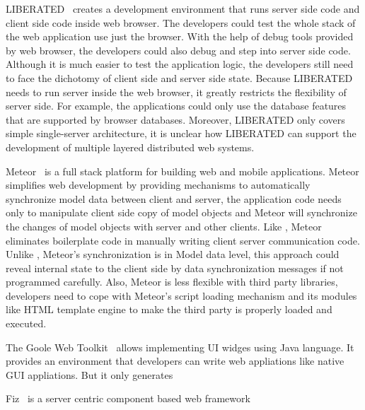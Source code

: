 LIBERATED~\cite{lipman2011liberated} creates a development environment that runs server side code and 
client side code inside web browser.
The developers could test the whole stack of the web application use just the browser.
With the help of \js{} debug tools provided by web browser, the developers could also
debug and step into server side code.
Although it is much easier to test the application logic,
the developers still need to face the dichotomy of client side and server side state.
Because LIBERATED needs to run server inside the web browser,
it greatly restricts the flexibility of server side.
For example, the applications could only use the database features that are supported by
browser databases.
Moreover, LIBERATED only covers simple single-server architecture, 
it is unclear how LIBERATED can support the development of multiple layered distributed web systems.

Meteor~\cite{meteor} is a full stack platform for building web and mobile applications.
Meteor simplifies web development by providing mechanisms to automatically synchronize model data 
between client and server,
the application code needs only to manipulate client side copy of model objects and
Meteor will synchronize the changes of model objects with server and other clients.
Like \cb{}, Meteor eliminates boilerplate code in manually writing client server communication code.
Unlike \cb{}, Meteor's synchronization is in Model data level, this approach
could reveal internal state to the client side by data synchronization messages if not programmed carefully.
Also, Meteor is less flexible with third party \js{} libraries, 
developers need to cope with 
Meteor's script loading mechanism and its modules like HTML template engine
 to make the third party \js{} is properly loaded and executed.

The Goole Web Toolkit~\cite{GWT} allows implementing UI widges using Java language.
It provides an environment that developers can write web appliations 
like native GUI appliations. 
But it only generates


Fiz~\cite{OusterhoutFiz2009} is a server centric component based web framework